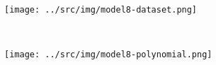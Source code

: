 \documentclass[12pt]{article}
\begin{document}
	\begin{figure}
		\begin{minipage}[c]{.5\textwidth}
			\centering
			\texttt{[image: ../src/img/model8-dataset.png]}
			\label{fig:model8-dataset}
		\end{minipage}
		~
		\begin{minipage}[c]{.5\textwidth}
			\centering
			\texttt{[image: ../src/img/model8-polynomial.png]}
			\label{fig:model8-polynomial}
		\end{minipage}
	\end{figure}

	
\end{document}
